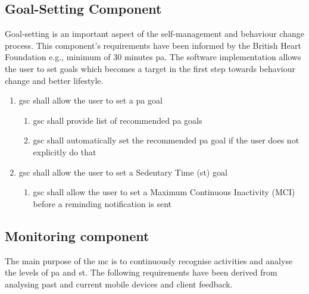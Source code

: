     \subsection{Goal-Setting Component}
    \label{section-goal-setting-component}
    Goal-setting is an important aspect of the self-management and behaviour change process. This component's requirements have been informed by the British Heart Foundation \citep[14]{townsend2015} e.g., minimum of 30 minutes \gls{pa}. The software implementation allows the user to set goals which becomes a target in the first step towards behaviour change and better lifestyle.
    
    \begin{enumerate}
        \item \gls{gsc} shall allow the user to set a \gls{pa} goal
        \begin{enumerate}
            \item \gls{gsc} shall provide list of recommended \gls{pa} goals
            \item \gls{gsc} shall automatically set the recommended \gls{pa} goal if the user does not explicitly do that 
        \end{enumerate}
        \item \gls{gsc} shall allow the user to set a Sedentary Time (\gls{st}) goal
        \begin{enumerate}
            \item \gls{gsc} shall allow the user to set a Maximum Continuous Inactivity (MCI) before a reminding notification is sent 
        \end{enumerate}
    \end{enumerate}
    
    
    \subsection{Monitoring component}
    \label{subsection:monitoring-component}
    The main purpose of the \gls{mc} is to continuously recognise activities and analyse the levels of \gls{pa} and \gls{st}. The following requirements have been derived from analysing past and current mobile devices and client feedback.
    
